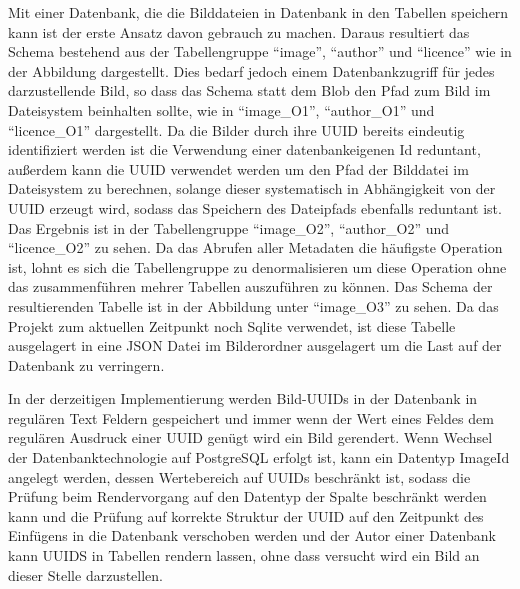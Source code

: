 Mit einer Datenbank, die die Bilddateien in Datenbank in den Tabellen speichern
kann ist der erste Ansatz davon gebrauch zu machen. Daraus resultiert das Schema
bestehend aus der Tabellengruppe ``image'', ``author'' und ``licence'' wie in
der Abbildung dargestellt. Dies bedarf jedoch einem Datenbankzugriff für jedes
darzustellende Bild, so dass das Schema statt dem Blob den Pfad zum Bild im
Dateisystem beinhalten sollte, wie in ``image\_O1'', ``author\_O1'' und
``licence\_O1'' dargestellt. Da die Bilder durch ihre UUID bereits eindeutig
identifiziert werden ist die Verwendung einer datenbankeigenen Id reduntant,
außerdem kann die UUID verwendet werden um den Pfad der Bilddatei im Dateisystem
zu berechnen, solange dieser systematisch in Abhängigkeit von der UUID erzeugt
wird, sodass das Speichern des Dateipfads ebenfalls reduntant ist. Das Ergebnis
ist in der Tabellengruppe ``image\_O2'', ``author\_O2'' und ``licence\_O2'' zu
sehen. Da das Abrufen aller Metadaten die häufigste Operation ist, lohnt es sich
die Tabellengruppe zu denormalisieren um diese Operation ohne das zusammenführen
mehrer Tabellen auszuführen zu können. Das Schema der resultierenden Tabelle ist
in der Abbildung unter ``image\_O3'' zu sehen. Da das Projekt zum aktuellen
Zeitpunkt noch Sqlite verwendet, ist diese Tabelle ausgelagert in eine JSON
Datei im Bilderordner ausgelagert um die Last auf der Datenbank zu verringern.

In der derzeitigen Implementierung werden Bild-UUIDs in der Datenbank in
regulären Text Feldern gespeichert und immer wenn der Wert eines Feldes dem
regulären Ausdruck einer UUID genügt wird ein Bild gerendert. Wenn Wechsel der
Datenbanktechnologie auf PostgreSQL erfolgt ist, kann ein Datentyp ImageId
angelegt werden, dessen Wertebereich auf UUIDs beschränkt ist, sodass die
Prüfung beim Rendervorgang auf den Datentyp der Spalte beschränkt werden kann
und die Prüfung auf korrekte Struktur der UUID auf den Zeitpunkt des Einfügens
in die Datenbank verschoben werden und der Autor einer Datenbank kann UUIDS in
Tabellen rendern lassen, ohne dass versucht wird ein Bild an dieser Stelle
darzustellen.

